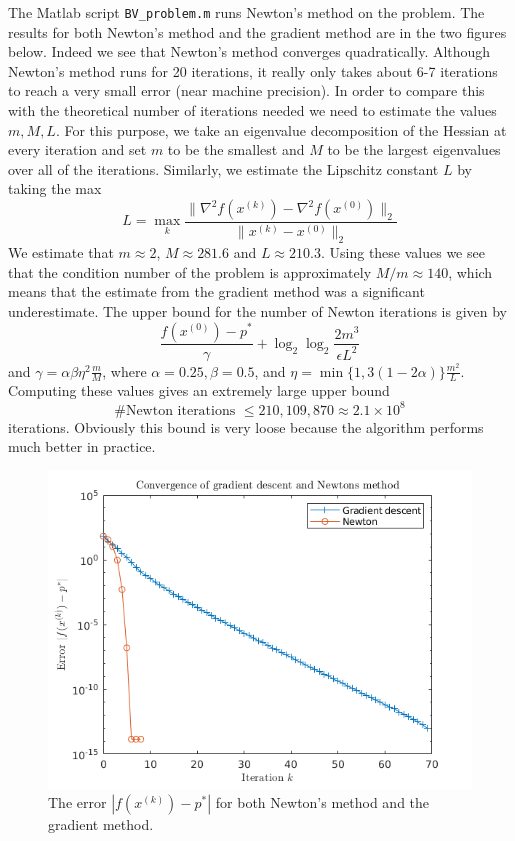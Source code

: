 \documentclass[11pt]{amsart}
\begin{document}
\begin{enumerate}
\begin{enumerate}
The Matlab script \texttt{BV\_problem.m} runs Newton's method on the problem.  The results for both Newton's method and the gradient method are in the two figures below.  Indeed we see that Newton's method converges quadratically.  Although Newton's method runs for 20 iterations, it really only takes about 6-7 iterations to reach a very small error (near machine precision).  In order to compare this with the theoretical number of iterations needed we need to estimate the values $m,M,L$.  For this purpose, we take an eigenvalue decomposition of the Hessian at every iteration and set $m$ to be the smallest and $M$ to be the largest eigenvalues over all of the iterations.  Similarly, we estimate the Lipschitz constant $L$ by taking the max
\[
L = \max_k \frac{\| \nabla^2 f(x^{(k)}) - \nabla^2 f(x^{(0)})  \|_2}{\|x^{(k)} - x^{(0)}\|_2}
\]
We estimate that $m \approx 2$, $M \approx 281.6$ and $L \approx 210.3$.  Using these values we see that the condition number of the problem is approximately $M/m \approx 140$, which means that the estimate from the gradient method was a significant underestimate.  The upper bound for the number of Newton iterations is given by
\[
\frac{f(x^{(0)}) - p^*}{\gamma} + \log_2 \log_2 \frac{2m^3}{\epsilon L^2}
\]
and $\gamma = \alpha \beta \eta^2 \frac{m}{M}$, where $\alpha = 0.25, \beta = 0.5$, and $\eta = \min \{ 1, 3(1 - 2\alpha)\} \frac{m^2}{ L}$.  Computing these values gives an extremely large upper bound
\[
\text{\# Newton iterations  } \le 210,109,870 \approx 2.1 \times 10^8
\]
iterations.  Obviously this bound is very loose because the algorithm performs much better in practice.



\begin{figure}[H]
\centering
\includegraphics[width=5in]{error.png}
\caption{The error $|f(x^{(k)}) - p^*|$ for both Newton's method and the gradient method.}
\label{fig:error}
\end{figure}



\end{enumerate}
\end{enumerate}
\end{document}
